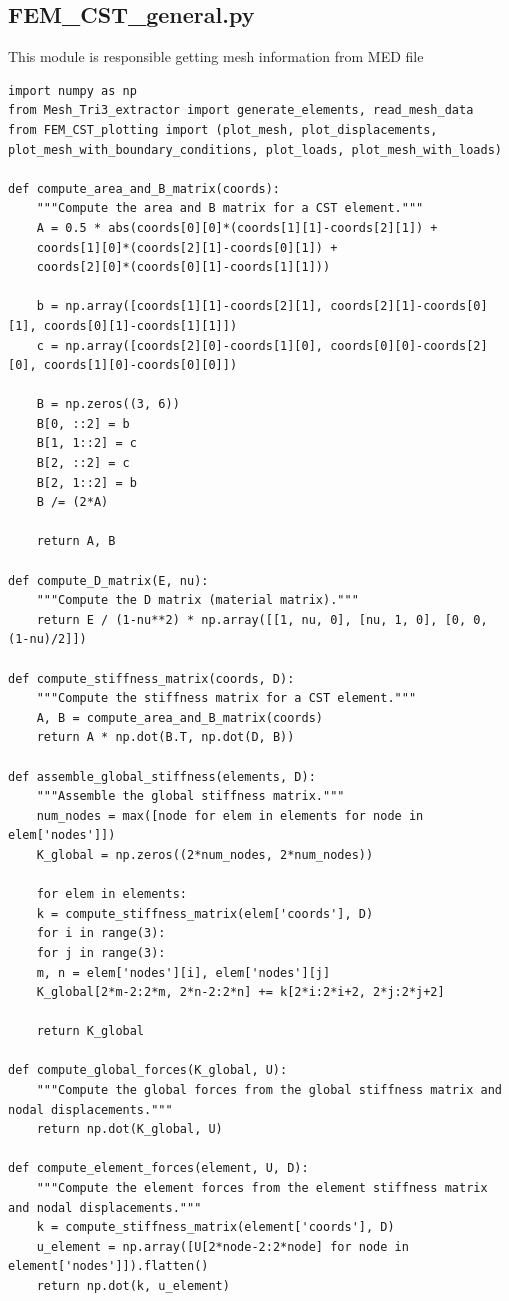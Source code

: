 \documentclass[12pt]{report}
\begin{document}
	\subsection{FEM\_CST\_general.py}
This module is responsible getting mesh information from MED file
\begin{lstlisting}[style=mypython]
import numpy as np
from Mesh_Tri3_extractor import generate_elements, read_mesh_data
from FEM_CST_plotting import (plot_mesh, plot_displacements, plot_mesh_with_boundary_conditions, plot_loads, plot_mesh_with_loads)

def compute_area_and_B_matrix(coords):
	"""Compute the area and B matrix for a CST element."""
	A = 0.5 * abs(coords[0][0]*(coords[1][1]-coords[2][1]) +
	coords[1][0]*(coords[2][1]-coords[0][1]) +
	coords[2][0]*(coords[0][1]-coords[1][1]))
	
	b = np.array([coords[1][1]-coords[2][1], coords[2][1]-coords[0][1], coords[0][1]-coords[1][1]])
	c = np.array([coords[2][0]-coords[1][0], coords[0][0]-coords[2][0], coords[1][0]-coords[0][0]])
	
	B = np.zeros((3, 6))
	B[0, ::2] = b
	B[1, 1::2] = c
	B[2, ::2] = c
	B[2, 1::2] = b
	B /= (2*A)
	
	return A, B

def compute_D_matrix(E, nu):
	"""Compute the D matrix (material matrix)."""
	return E / (1-nu**2) * np.array([[1, nu, 0], [nu, 1, 0], [0, 0, (1-nu)/2]])

def compute_stiffness_matrix(coords, D):
	"""Compute the stiffness matrix for a CST element."""
	A, B = compute_area_and_B_matrix(coords)
	return A * np.dot(B.T, np.dot(D, B))

def assemble_global_stiffness(elements, D):
	"""Assemble the global stiffness matrix."""
	num_nodes = max([node for elem in elements for node in elem['nodes']])
	K_global = np.zeros((2*num_nodes, 2*num_nodes))

	for elem in elements:
	k = compute_stiffness_matrix(elem['coords'], D)
	for i in range(3):
	for j in range(3):
	m, n = elem['nodes'][i], elem['nodes'][j]
	K_global[2*m-2:2*m, 2*n-2:2*n] += k[2*i:2*i+2, 2*j:2*j+2]
	
	return K_global
	
def compute_global_forces(K_global, U):
	"""Compute the global forces from the global stiffness matrix and nodal displacements."""
	return np.dot(K_global, U)

def compute_element_forces(element, U, D):
	"""Compute the element forces from the element stiffness matrix and nodal displacements."""
	k = compute_stiffness_matrix(element['coords'], D)
	u_element = np.array([U[2*node-2:2*node] for node in element['nodes']]).flatten()
	return np.dot(k, u_element)


\end{lstlisting}
\end{document}

